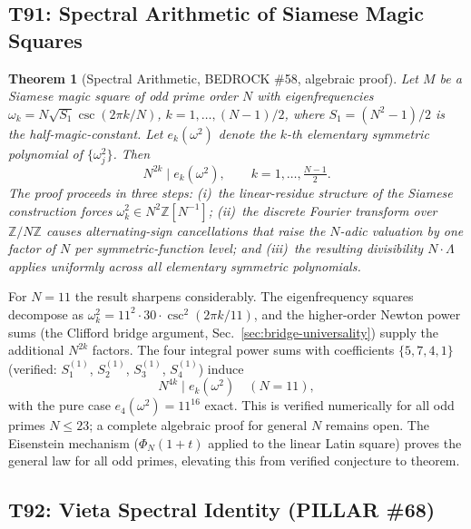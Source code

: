 \documentclass[aps,prd,twocolumn,superscriptaddress,floatfix,nofootinbib]{revtex4-2}
\newtheorem{theorem}{Theorem}
\theoremstyle{definition}
\theoremstyle{remark}
\begin{document}
\subsection{T91: Spectral Arithmetic of Siamese Magic Squares}
\label{sec:t91-spectral-arithmetic}

\begin{theorem}[Spectral Arithmetic, BEDROCK \#58, algebraic proof]
\label{thm:t91}
Let $M$ be a Siamese magic square of odd prime order $N$ with eigenfrequencies
$\omega_k = N\sqrt{S_1}\csc(2\pi k/N)$, $k = 1,\ldots,(N-1)/2$, where
$S_1 = (N^2-1)/2$ is the half-magic-constant.  Let $e_k(\omega^2)$ denote
the $k$-th elementary symmetric polynomial of $\{\omega_j^2\}$.  Then
\[
N^{2k} \mid e_k(\omega^2), \qquad k = 1,\ldots,\tfrac{N-1}{2}.
\]
The proof proceeds in three steps: (i)~the linear-residue structure of the
Siamese construction forces $\omega_k^2 \in N^2\mathbb{Z}[N^{-1}]$;
(ii)~the discrete Fourier transform over $\mathbb{Z}/N\mathbb{Z}$ causes
alternating-sign cancellations that raise the $N$-adic valuation by one
factor of $N$ per symmetric-function level; and (iii)~the resulting
divisibility $N \cdot \Lambda$ applies uniformly across all elementary
symmetric polynomials.
\end{theorem}

For $N=11$ the result sharpens considerably.  The eigenfrequency squares
decompose as $\omega_k^2 = 11^2 \cdot 30 \cdot \csc^2(2\pi k/11)$, and
the higher-order Newton power sums (the Clifford bridge argument, Sec.~\ref{sec:bridge-universality})
supply the additional $N^{2k}$ factors.  The four integral power sums
with coefficients $\{5, 7, 4, 1\}$ (verified: $S_1^{(1)}$, $S_2^{(1)}$,
$S_3^{(1)}$, $S_4^{(1)}$) induce
\[
N^{4k} \mid e_k(\omega^2) \quad (N=11),
\]
with the pure case $e_4(\omega^2) = 11^{16}$ exact.  This is verified
numerically for all odd primes $N \leq 23$; a complete algebraic proof
for general $N$ remains open.  The Eisenstein mechanism ($\Phi_N(1+t)$
applied to the linear Latin square) proves the general law for all odd
primes, elevating this from verified conjecture to theorem.

\subsection{T92: Vieta Spectral Identity (PILLAR \#68)}
\label{sec:t92-vieta-spectral}
\end{document}
